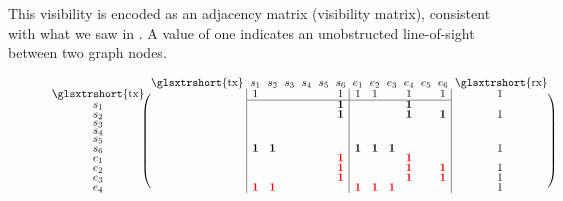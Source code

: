 This visibility is encoded as an adjacency matrix (visibility matrix), consistent with what we saw in . A value of one indicates an unobstructed \gls{line-of-sight} between two graph nodes.

\begin{figure}[htpb]
  \centering
  \begin{equation*}
    \renewcommand{\arraystretch}{.6}
    \makeatletter\setlength\BA@colsep{3pt}\makeatother
    \begin{blockarray}{ccccccccccccccc}
      & \text{\glsxtrshort{tx}} & s_1 & s_2 & s_3 & s_4 & s_5 & s_6 & e_1 & e_2 & e_3 & e_4 & e_5 & e_6 & \text{\glsxtrshort{rx}}\\
      \begin{block}{c(>{\medspace}c|cccccc|cccccc|c<{\medspace})}
        \text{\glsxtrshort{tx}} & {} & 1 & {} & {} & {} & {} & 1 & 1 & 1 & {} & 1 & {} & 1 & 1\\
        \BAhhline{~~------------~}
        s_1 & {} & {} & {} & {} & {} & {} & \bsit{1} & {} & {} & {} & \bsit{1} & {} & & {} & {}\\ %
        s_2 & {} & {} & {} & {} & {} & {} & \bsit{1} & {} & {} & {} & \bsit{1} & {} & \bsit{1} & 1\\ %
        s_3 & {} & {} & {} & {} & {} & {} & {} & {} & {} & {} & {} & {} & {} & {}\\ %
        s_4 & {} & {} & {} & {} & {} & {} & {} & {} & {} & {} & {} & {} & {} & {}\\ %
        s_5 & {} & {} & {} & {} & {} & {} & {} & {} & {} & {} & {} & {} & {} & {}\\ %
        s_6 & {} & \bsit{1} & \bsit{1} & {} & {} & {} & {} & \bsit{1} & \bsit{1} & \bsit{1} & {} & {} & {} & 1\\ %
        e_1 & {} & {} & {} & {} & {} & {} & \bsit{\color{red}1} & {} & {} & {} & \bsit{\color{red}1} & {} & {} & {}\\ %
        e_2 & {} & {} & {} & {} & {} & {} & \bsit{\color{red}1} & {} & {} & {} & \bsit{\color{red}1} & {} & \bsit{\color{red}1} & 1\\ %
        e_3 & {} & {} & {} & {} & {} & {} & \bsit{\color{red}1} & {} & {} & {} & \bsit{\color{red}1} & {} & \bsit{\color{red}1} & 1\\ %
        e_4 & {} & \bsit{\color{red}1} & \bsit{\color{red}1} & {} & {} & {} & {} & \bsit{\color{red}1} & \bsit{\color{red}1} & \bsit{\color{red}1} & {} & {} & {} & 1 \\ %

\end{block}
\end{blockarray}
\end{equation*}
\end{figure}
